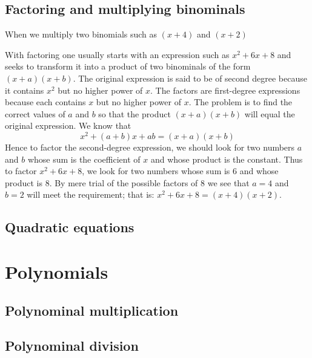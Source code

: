 


\subsection{Factoring and multiplying binominals}
When we multiply two binomials such as $(x+4)$ and $(x+2)$ 



With factoring one usually starts with an expression such as
$x^2 + 6 x + 8$ and seeks to transform it into a product of two 
binominals of the form $(x + a)(x + b)$. The original expression is said 
to be of second degree because it contains $x^2$ but no higher power of 
$x$. The factors are first-degree expressions because each contains $x$ but 
no
higher power of $x$. The problem is to find the correct values of $a$ and
$b$ so that the product $(x + a)(x + b)$ will equal the original
expression. We know that
\begin{equation}\label{alg:binom_factor}
x^2 + (a + b)x + ab = (x + a)(x + b)
\end{equation}
Hence to factor the second-degree expression, we should look for two
numbers $a$ and $b$ whose sum is the coefficient of $x$ and whose product
is the constant. Thus to factor $x^2 + 6 x + 8$, we look for two numbers
whose sum is $6$ and whose product is $8$. By mere trial of the possible
factors of $8$ we see that $a = 4$ and $b = 2$ will meet the requirement;
that is: $x^2 + 6 x + 8 = (x + 4)(x + 2)$.


\subsection{Quadratic equations}

\section{Polynomials}

\subsection{Polynominal multiplication}

\subsection{Polynominal division}

